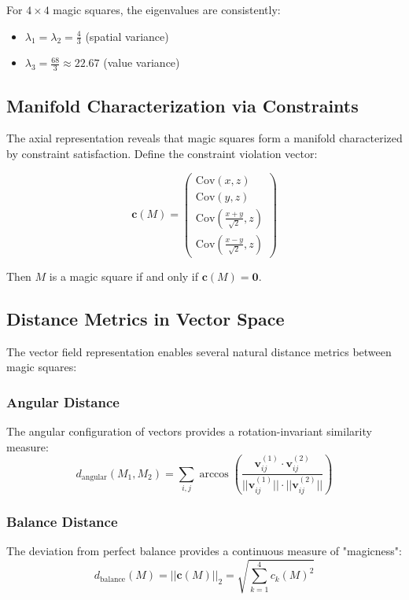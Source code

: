 For $4 \times 4$ magic squares, the eigenvalues are consistently:
\begin{itemize}
    \item $\lambda_1 = \lambda_2 = \frac{4}{3}$ (spatial variance)
    \item $\lambda_3 = \frac{68}{3} \approx 22.67$ (value variance)
\end{itemize}

\subsection{Manifold Characterization via Constraints}

The axial representation reveals that magic squares form a manifold characterized by constraint satisfaction. Define the constraint violation vector:

\[\mathbf{c}(M) = \begin{pmatrix}
\text{Cov}(x,z) \\
\text{Cov}(y,z) \\
\text{Cov}\left(\frac{x+y}{\sqrt{2}},z\right) \\
\text{Cov}\left(\frac{x-y}{\sqrt{2}},z\right)
\end{pmatrix}\]

Then $M$ is a magic square if and only if $\mathbf{c}(M) = \mathbf{0}$.

\subsection{Distance Metrics in Vector Space}

The vector field representation enables several natural distance metrics between magic squares:

\subsubsection{Angular Distance}
The angular configuration of vectors provides a rotation-invariant similarity measure:
\[d_{\text{angular}}(M_1, M_2) = \sum_{i,j} \arccos\left(\frac{\mathbf{v}_{ij}^{(1)} \cdot \mathbf{v}_{ij}^{(2)}}{||\mathbf{v}_{ij}^{(1)}|| \cdot ||\mathbf{v}_{ij}^{(2)}||}\right)\]

\subsubsection{Balance Distance}
The deviation from perfect balance provides a continuous measure of "magicness":
\[d_{\text{balance}}(M) = ||\mathbf{c}(M)||_2 = \sqrt{\sum_{k=1}^4 c_k(M)^2}\]

